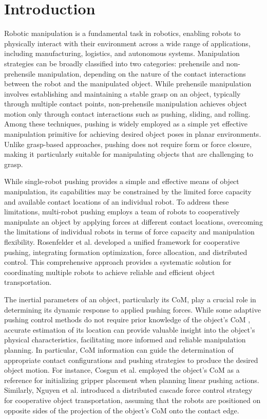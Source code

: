 \section{Introduction}
Robotic manipulation \cite{mason2018toward} is a fundamental task in robotics, enabling robots to physically interact with their environment across a wide range of applications, including manufacturing, logistics, and autonomous systems. Manipulation strategies can be broadly classified into two categories: prehensile and non-prehensile manipulation, depending on the nature of the contact interactions between the robot and the manipulated object. While prehensile manipulation \cite{bicchi2000robotic} involves establishing and maintaining a stable grasp on an object, typically through multiple contact points, non-prehensile manipulation \cite{lynch1996nonprehensile,lynch1999dynamic} achieves object motion only through contact interactions such as pushing, sliding, and rolling. Among these techniques, pushing \cite{mason1986mechanics} is widely employed as a simple yet effective manipulation primitive for achieving desired object poses in planar environments. Unlike grasp-based approaches, pushing does not require form or force closure, making it particularly suitable for manipulating objects that are challenging to grasp. 

While single-robot pushing provides a simple and effective means of object manipulation, its capabilities may be constrained by the limited force capacity and available contact locations of an individual robot. To address these limitations, multi-robot pushing \cite{ozaki1997distributed,tuci2018cooperative} employs a team of robots to cooperatively manipulate an object by applying forces at different contact locations, overcoming the limitations of individual robots in terms of force capacity and manipulation flexibility. Rosenfelder et al. \cite{rosenfelder2024force} developed a unified framework for cooperative pushing, integrating formation optimization, force allocation, and distributed control. This comprehensive approach provides a systematic solution for coordinating multiple robots to achieve reliable and efficient object transportation.

The inertial parameters of an object, particularly its CoM, play a crucial role in determining its dynamic response to applied pushing forces. While some adaptive pushing control methods do not require prior knowledge of the object's CoM \cite{wang2016kinematic,nguyen2026dnpush}, accurate estimation of its location can provide valuable insight into the object's physical characteristics, facilitating more informed and reliable manipulation planning. In particular, CoM information can guide the determination of appropriate contact configurations and pushing strategies to produce the desired object motion. For instance, Cosgun et al. \cite{cosgun2011push} employed the object's CoM as a reference for initializing gripper placement when planning linear pushing actions. Similarly, Nguyen et al. \cite{nguyen2024distributed} introduced a distributed cascade force control strategy for cooperative object transportation, assuming that the robots are positioned on opposite sides of the projection of the object's CoM onto the contact edge. 

